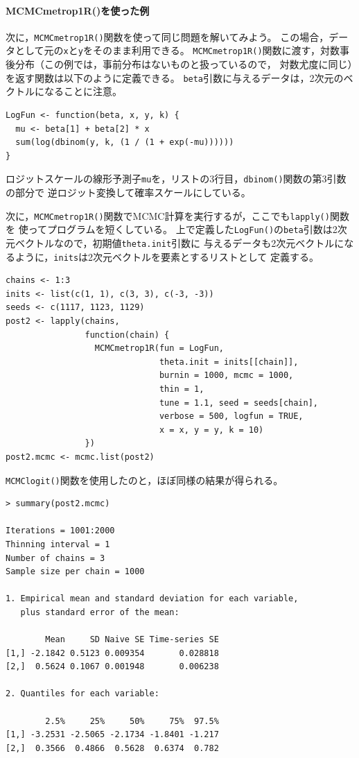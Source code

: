 \documentclass[11pt,uplatex]{jsarticle}
\begin{document}
\paragraph{MCMCmetrop1R()を使った例}

次に，\texttt{MCMCmetrop1R()}関数を使って同じ問題を解いてみよう。
この場合，データとして元の\texttt{x}と\texttt{y}をそのまま利用できる。
\texttt{MCMCmetrop1R()}関数に渡す，対数事後分布（この例では，事前分布はないものと扱っているので，
対数尤度に同じ）を返す関数は以下のように定義できる。
\texttt{beta}引数に与えるデータは，2次元のベクトルになることに注意。

\begin{lstlisting}
LogFun <- function(beta, x, y, k) {
  mu <- beta[1] + beta[2] * x
  sum(log(dbinom(y, k, (1 / (1 + exp(-mu))))))
}
\end{lstlisting}

\noindent
ロジットスケールの線形予測子\texttt{mu}を，リストの3行目，\texttt{dbinom()}関数の第3引数の部分で
逆ロジット変換して確率スケールにしている。

次に，\texttt{MCMCmetrop1R()}関数でMCMC計算を実行するが，ここでも\texttt{lapply()}関数を
使ってプログラムを短くしている。
上で定義した\texttt{LogFun()}の\texttt{beta}引数は2次元ベクトルなので，初期値\texttt{theta.init}引数に
与えるデータも2次元ベクトルになるように，\texttt{inits}は2次元ベクトルを要素とするリストとして
定義する。


\begin{lstlisting}
chains <- 1:3
inits <- list(c(1, 1), c(3, 3), c(-3, -3))
seeds <- c(1117, 1123, 1129)
post2 <- lapply(chains,
                function(chain) {
                  MCMCmetrop1R(fun = LogFun,
                               theta.init = inits[[chain]],
                               burnin = 1000, mcmc = 1000,
                               thin = 1,
                               tune = 1.1, seed = seeds[chain],
                               verbose = 500, logfun = TRUE,
                               x = x, y = y, k = 10)
                })
post2.mcmc <- mcmc.list(post2)
\end{lstlisting}

\texttt{MCMClogit()}関数を使用したのと，ほぼ同様の結果が得られる。

\begin{lstlisting}
> summary(post2.mcmc)

Iterations = 1001:2000
Thinning interval = 1 
Number of chains = 3 
Sample size per chain = 1000 

1. Empirical mean and standard deviation for each variable,
   plus standard error of the mean:

        Mean     SD Naive SE Time-series SE
[1,] -2.1842 0.5123 0.009354       0.028818
[2,]  0.5624 0.1067 0.001948       0.006238

2. Quantiles for each variable:

        2.5%     25%     50%     75%  97.5%
[1,] -3.2531 -2.5065 -2.1734 -1.8401 -1.217
[2,]  0.3566  0.4866  0.5628  0.6374  0.782
\end{lstlisting}
\end{document}
